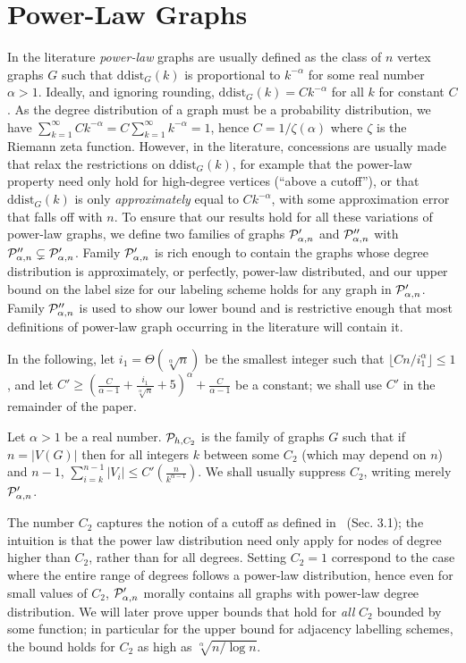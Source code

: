 
 \section{Power-Law Graphs}\label{Sec:GraphFamilies}

In the literature \emph{power-law} graphs are usually defined as the class of $n$ vertex graphs $G$ such that $\mathrm{ddist}_G(k)$
is proportional to $k^{-\alpha}$ for some real number $\alpha > 1$. Ideally, and ignoring rounding,  $\mathrm{ddist}_G(k) = Ck^{-\alpha}$ for all $k$ for constant $C$. As the degree distribution of a graph must be a probability distribution, we have $\sum_{k=1}^\infty C k^{-\alpha} = C \sum_{k=1}^\infty k^{-\alpha} = 1$, hence  $C = 1/\zeta(\alpha)$ where $\zeta$ is the Riemann zeta function. However, in the literature, concessions are usually made that relax
the restrictions on $\mathrm{ddist}_G(k)$, for example that the power-law property need only hold for high-degree
vertices (``above a cutoff''), or that $\mathrm{ddist}_G(k)$ is only \emph{approximately} equal to $Ck^{-\alpha}$,
with some approximation error that falls off with $n$.
To ensure that our results hold for all these variations of power-law graphs, 
 we define two families of graphs $ \mathcal{P}'_{\alpha,n}$ and $ \mathcal{P}''_{\alpha,n}$ with $ \mathcal{P}''_{\alpha,n}\subsetneq \mathcal{P}'_{\alpha,n}$. Family $ \mathcal{P}'_{\alpha,n}$ is rich enough to contain the graphs whose degree distribution is approximately, or perfectly, power-law distributed, and our upper bound on the label size for our labeling scheme holds for any graph in $ \mathcal{P}'_{\alpha,n}$. Family $ \mathcal{P}''_{\alpha,n}$ is used to show our lower bound
 and is restrictive enough that most definitions of power-law graph occurring in the literature will contain it. 
 
In the following, let $i_1 = \Theta(\sqrt[\alpha]n)$ be the smallest integer such that $\lfloor Cn/i_1^\alpha\rfloor \leq 1$, and let $C'\geq(\frac C{\alpha-1} + \frac{i_1}{\sqrt[\alpha] n} + 5)^{\alpha} + \frac{C}{\alpha - 1}$ be a constant; we shall use $C'$ in the remainder of the paper.
\begin{definition} \label{def:general-family}
Let $\alpha > 1$ be a real number. $ \mathcal{P}_{h,C_2}$ is the family of graphs $G$ such that if $n = \vert V(G)\vert$ then for all integers $k$ between  some  $C_2$ (which may depend on $n$) and $n-1$, $\sum_{i = k}^{n-1} {\vert V_i\vert} \leq C'(\frac{n}{k^{\alpha-1}})$. We shall usually suppress $C_2$, writing merely $ \mathcal{P}'_{\alpha,n}$.
\end{definition}
The number $C_2$ captures the notion of a cutoff as defined in~\cite{clauset2009power} (Sec. 3.1); the intuition is  that the power law distribution need only apply for nodes of degree higher than $C_2$, rather than for all degrees. 
Setting $C_2 = 1$ correspond to the case where the entire range of degrees follows a power-law distribution, hence
even for small values of $C_2$, $ \mathcal{P}'_{\alpha,n}$ morally contains all graphs with power-law degree distribution.
We will later prove upper bounds that hold for \emph{all} $C_2$ bounded by some function; in particular
for the upper bound for adjacency labelling schemes, the bound holds for $C_2$ as high as  $\sqrt[\alpha]{n/\log n}$.

